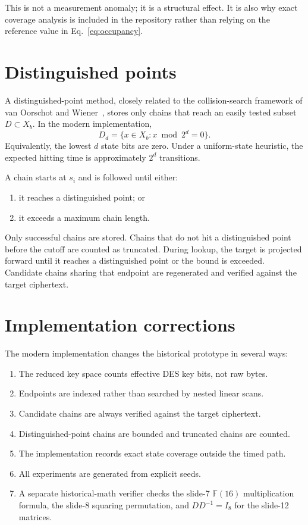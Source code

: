 \documentclass[11pt]{article}
\newcommand{\GF}{\mathbb{F}}
\begin{document}
This is not a measurement anomaly; it is a structural effect.  It is also why
exact coverage analysis is included in the repository rather than relying on
the reference value in Eq.~\eqref{eq:occupancy}.

\section{Distinguished points}

A distinguished-point method, closely related to the collision-search framework of van Oorschot and Wiener~\cite{vanoorschot1999}, stores only chains that reach an easily tested
subset $D\subset X_b$.  In the modern implementation,
\[
  D_d=\{x\in X_b : x\bmod 2^d=0\}.
\]
Equivalently, the lowest $d$ state bits are zero.  Under a uniform-state
heuristic, the expected hitting time is approximately $2^d$ transitions.

A chain starts at $s_i$ and is followed until either:

\begin{enumerate}
  \item it reaches a distinguished point; or
  \item it exceeds a maximum chain length.
\end{enumerate}

Only successful chains are stored.  Chains that do not hit a distinguished
point before the cutoff are counted as truncated.  During lookup, the target
is projected forward until it reaches a distinguished point or the bound is
exceeded.  Candidate chains sharing that endpoint are regenerated and verified
against the target ciphertext.

\section{Implementation corrections}

The modern implementation changes the historical prototype in several ways:

\begin{enumerate}
  \item The reduced key space counts effective DES key bits, not raw bytes.
  \item Endpoints are indexed rather than searched by nested linear scans.
  \item Candidate chains are always verified against the target ciphertext.
  \item Distinguished-point chains are bounded and truncated chains are counted.
  \item The implementation records exact state coverage outside the timed path.
  \item All experiments are generated from explicit seeds.
  \item A separate historical-math verifier checks the slide-7 $\GF(16)$
        multiplication formula, the slide-8 squaring permutation, and
        $DD^{-1}=I_8$ for the slide-12 matrices.
\end{enumerate}
\end{document}
